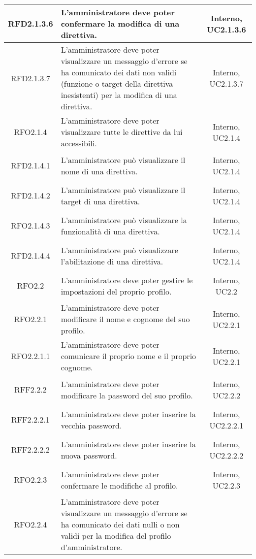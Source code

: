 \begin{longtable}{|c|>{\centering}m{7cm}|c|}
	\hypertarget{RFD2.1.3.6}{RFD2.1.3.6} & L'amministratore deve poter confermare la modifica di una direttiva. & Interno, UC2.1.3.6\\ \hline
	\hypertarget{RFD2.1.3.7}{RFD2.1.3.7} & L'amministratore deve poter visualizzare un messaggio d'errore se ha comunicato dei dati non validi (funzione o target della direttiva inesistenti) per la modifica di una direttiva. & Interno, UC2.1.3.7\\ \hline
	\hypertarget{RFO2.1.4}{RFO2.1.4} & L'amministratore deve poter visualizzare tutte le direttive da lui accessibili. & Interno, UC2.1.4\\ \hline
	\hypertarget{RFD2.1.4.1}{RFD2.1.4.1} & L'amministratore può visualizzare il nome di una direttiva. & Interno, UC2.1.4\\ \hline
	\hypertarget{RFD2.1.4.2}{RFD2.1.4.2} & L'amministratore può visualizzare il target di una direttiva. & Interno, UC2.1.4\\ \hline
	\hypertarget{RFO2.1.4.3}{RFO2.1.4.3} & L'amministratore può visualizzare la funzionalità di una direttiva. & Interno, UC2.1.4\\ \hline
	\hypertarget{RFD2.1.4.4}{RFD2.1.4.4} & L'amministratore può visualizzare l'abilitazione di una direttiva. & Interno, UC2.1.4\\ \hline
	\hypertarget{RFO2.2}{RFO2.2} & L'amministratore deve poter gestire le impostazioni del proprio profilo. & Interno, UC2.2\\ \hline
	\hypertarget{RFO2.2.1}{RFO2.2.1} & L'amministratore deve poter modificare il nome e cognome del suo profilo. & Interno, UC2.2.1\\ \hline
	\hypertarget{RFO2.2.1.1}{RFO2.2.1.1} & L'amministratore deve poter comunicare il proprio nome e il proprio cognome. & Interno, UC2.2.1\\ \hline
	\hypertarget{RFF2.2.2}{RFF2.2.2} & L'amministratore deve poter modificare la password del suo profilo. & Interno, UC2.2.2\\ \hline
	\hypertarget{RFF2.2.2.1}{RFF2.2.2.1} & L'amministratore deve poter inserire la vecchia password. & Interno, UC2.2.2.1\\ \hline
	\hypertarget{RFF2.2.2.2}{RFF2.2.2.2} & L'amministratore deve poter inserire la nuova password. & Interno, UC2.2.2.2\\ \hline
	\hypertarget{RFO2.2.3}{RFO2.2.3} & L'amministratore deve poter confermare le modifiche al profilo. & Interno, UC2.2.3\\ \hline
	\hypertarget{RFO2.2.4}{RFO2.2.4} & L'amministratore deve poter visualizzare un messaggio d'errore se ha comunicato dei dati nulli o non validi per la modifica del profilo d'amministratore.

\end{longtable}
